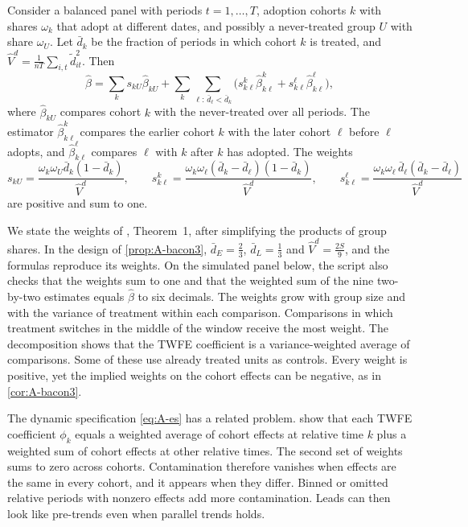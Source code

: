 \begin{theorem}\label{thm:A-bacon}
Consider a balanced panel with periods $t=1,\dots,T$, adoption cohorts $k$ with shares $\omega_k$ that adopt at
different dates, and possibly a never-treated group $U$ with share $\omega_U$. Let $\bar d_k$ be the fraction of
periods in which cohort $k$ is treated, and $\hat V^d=\frac{1}{nT}\sum_{i,t}\tilde d_{it}^2$. Then
\begin{equation*}
\hat\beta=\sum_k s_{kU}\hat\beta_{kU}+\sum_{k}\sum_{\ell:\,\bar d_\ell<\bar d_k}\Big(s^{k}_{k\ell}\hat\beta^{k}_{k\ell}+s^{\ell}_{k\ell}\hat\beta^{\ell}_{k\ell}\Big),
\end{equation*}
where $\hat\beta_{kU}$ compares cohort $k$ with the never-treated over all periods. The estimator
$\hat\beta^{k}_{k\ell}$ compares the earlier cohort $k$ with the later cohort $\ell$ before $\ell$ adopts, and
$\hat\beta^{\ell}_{k\ell}$ compares $\ell$ with $k$ after $k$ has adopted. The weights
\begin{equation*}
s_{kU}=\frac{\omega_k\omega_U\bar d_k(1-\bar d_k)}{\hat V^d},\qquad
s^{k}_{k\ell}=\frac{\omega_k\omega_\ell(\bar d_k-\bar d_\ell)(1-\bar d_k)}{\hat V^d},\qquad
s^{\ell}_{k\ell}=\frac{\omega_k\omega_\ell\,\bar d_\ell(\bar d_k-\bar d_\ell)}{\hat V^d}
\end{equation*}
are positive and sum to one.
\end{theorem}

We state the weights of \citet{GoodmanBacon2021}, Theorem~1, after simplifying the products of group shares. In the
design of \cref{prop:A-bacon3}, $\bar d_E=\frac{2}{3}$, $\bar d_L=\frac{1}{3}$ and $\hat V^d=\frac{2S}{9}$, and the
formulas reproduce its weights. On the simulated panel below, the script also checks that the weights sum to one and
that the weighted sum of the nine two-by-two estimates equals $\hat\beta$ to six decimals. The weights grow with group size and with the variance of treatment within each
comparison. Comparisons in which treatment switches in the middle of the window receive the most weight. The
decomposition shows that the TWFE coefficient is a variance-weighted average of comparisons. Some of these use
already treated units as controls. Every weight is positive, yet the implied weights on the cohort effects can be
negative, as in \cref{cor:A-bacon3}.

The dynamic specification \eqref{eq:A-es} has a related problem. \citet{SunAbraham2021} show that each TWFE
coefficient $\phi_k$ equals a weighted average of cohort effects at relative time $k$ plus a weighted sum of cohort
effects at other relative times. The second set of weights sums to zero across cohorts. Contamination therefore
vanishes when effects are the same in every cohort, and it appears when they differ. Binned or omitted relative
periods with nonzero effects add more contamination. Leads can then look like pre-trends even when parallel trends
holds.

